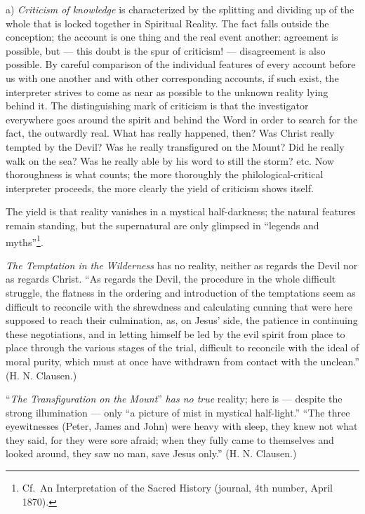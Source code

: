 \documentclass[12pt,a4paper,openany]{book}
\newcommand{\opage}[1]{\marginnote{\footnotesize\textit{[#1]}}}
\begin{document}
a) \emph{Criticism of knowledge} is characterized by the splitting
and dividing up of the whole that is locked together in Spiritual Reality.
The fact falls outside the conception; the account
is one thing and the real event another:
agreement is possible, but --- this doubt is
the spur of criticism! --- disagreement is also
possible. By careful comparison of the individual features of every
account before us with one another
and with other corresponding accounts, if such
exist, the interpreter strives to come as near as possible to the unknown
reality lying behind it. The
distinguishing mark of criticism is that the investigator everywhere goes around the spirit
and behind the Word in order to search for the fact,
the outwardly real. What has really happened, then? Was
Christ really tempted by the Devil? Was he really
transfigured on the Mount? Did he really walk
on the sea? Was he really able by his word
to still the storm? etc. Now thoroughness is what counts;
the more thoroughly the philological-critical interpreter proceeds,
the more clearly the yield of criticism shows itself.

The yield is that reality vanishes in a mystical
half-darkness; the natural features remain standing, but the
supernatural are only glimpsed in ``legends and myths''\footnote[1]{Cf.\ An Interpretation of the Sacred History (journal, 4th number, April 1870).}.

\emph{The Temptation in the Wilderness} has no reality, neither
as regards the Devil nor as regards Christ. ``As
\setcounter{footnote}{0}%
\opage{20}regards the Devil, the procedure in the whole difficult struggle, the flatness in the ordering and introduction
of the temptations seem as difficult to reconcile with
the shrewdness and calculating cunning that were here supposed to
reach their culmination, as, on Jesus' side, the patience in
continuing these negotiations, and in letting himself be led by the evil spirit
from place to place through the various
stages of the trial, difficult to reconcile with the ideal of
moral purity, which must at once have withdrawn from
contact with the unclean.'' (H. N. Clausen.)

``\emph{The Transfiguration on the Mount}'' \emph{has no true}
reality; here is --- despite the strong illumination ---
only ``a picture of mist in mystical half-light.'' ``The three
eyewitnesses (Peter, James and John) were heavy
with sleep, they knew not what they said, for they were sore afraid;
when they fully came to themselves and looked around,
they saw no man, save Jesus only.'' (H. N. Clausen.)
\end{document}
